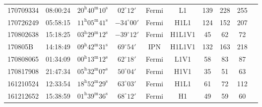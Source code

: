 \documentclass[11pt]{cuthesis}
\begin{document}
\begin{landscape}
\begin{tabular}{l c  c  c  c  c  c  c  c c |}
170709334 & 08:00:24  & $20^{\mathrm{h}}40^{\mathrm{m}}10^{\mathrm{s}}$ & $02^{\circ}12'$ &  Fermi   & L1     & 139 & 228 & 255 \\
170726249 & 05:58:15  & $11^{\mathrm{h}}05^{\mathrm{m}}41^{\mathrm{s}}$ & $-34^{\circ}00'$ & Fermi   & H1L1   & 124 & 152 & 207 \\
170802638 & 15:18:25  & $03^{\mathrm{h}}29^{\mathrm{m}}12^{\mathrm{s}}$ & $-39^{\circ}12'$ & Fermi   & H1L1V1 & 45  & 62  & 72 \\
170805B   & 14:18:49  & $09^{\mathrm{h}}42^{\mathrm{m}}31^{\mathrm{s}}$ & $69^{\circ}54'$ &  IPN     & H1L1V1 & 132 & 163 & 218 \\
170808065 & 01:34:09  & $00^{\mathrm{h}}13^{\mathrm{m}}12^{\mathrm{s}}$ & $62^{\circ}18'$ &  Fermi   & L1V1   & 58  & 83  & 87 \\
170817908 & 21:47:34  & $05^{\mathrm{h}}32^{\mathrm{m}}07^{\mathrm{s}}$ & $50^{\circ}04'$ &  Fermi   & H1V1   & 35  & 51  & 63 \\
161210524 & 12:33:54  & $18^{\mathrm{h}}52^{\mathrm{m}}29^{\mathrm{s}}$ & $63^{\circ}03'$ &  Fermi   & H1L1   & 61  & 72  & 112 \\
161212652 & 15:38:59  & $01^{\mathrm{h}}39^{\mathrm{m}}36^{\mathrm{s}}$ & $68^{\circ}12'$ &  Fermi   & H1     & 49  & 59  & 60 \\
\end{tabular}
\end{landscape}
\end{document}
